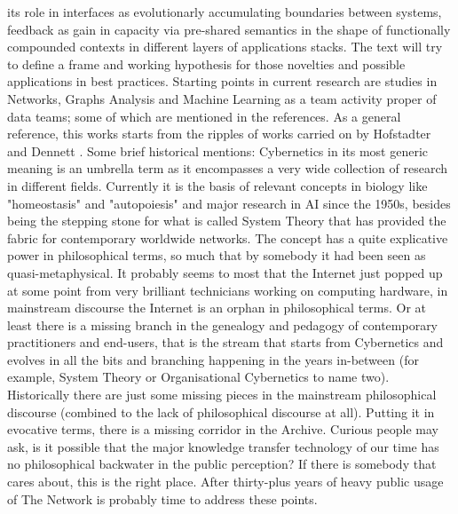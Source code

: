 \documentclass[14pt,a4paper]{extarticle}
\begin{document}
its role in interfaces as evolutionarly accumulating boundaries between systems, feedback as gain in capacity via pre-shared semantics in the shape of functionally compounded contexts in different layers of applications stacks. The text will try to define a frame and working hypothesis for those novelties and possible applications in best practices. Starting points in current research are studies in Networks, Graphs Analysis and Machine Learning as a team activity proper of data teams; some of which are mentioned in the references. As a general reference, this works starts from the ripples of works carried on by Hofstadter and Dennett \cite{hofstadter_gdel_1979} \cite{Hofstadter1981_HOFTMI_2}.
\newline
\hspace*{15mm}Some brief historical mentions: Cybernetics in its most generic meaning is an umbrella term as it encompasses a very wide collection of research in different fields. Currently it is the basis of relevant concepts in biology like "homeostasis" and "autopoiesis" and major research in AI since the 1950s, besides being the stepping stone for what is called System Theory that has provided the fabric for contemporary worldwide networks. The concept has a quite explicative power in philosophical terms, so much that by somebody it had been seen as quasi-metaphysical. It probably seems to most that the Internet just popped up at some point from very brilliant technicians working on computing hardware, in mainstream discourse the Internet is an orphan in philosophical terms. Or at least there is a missing branch in the genealogy and pedagogy of contemporary practitioners and end-users, that is the stream that starts from Cybernetics and evolves in all the bits and branching happening in the years in-between (for example, System Theory or Organisational Cybernetics to name two). Historically there are just some missing pieces in the mainstream philosophical discourse (combined to the lack of philosophical discourse at all). Putting it in evocative terms, there is a missing corridor in the Archive. Curious people may ask, is it possible that the major knowledge transfer technology of our time has no philosophical backwater in the public perception? If there is somebody that cares about, this is the right place. After thirty-plus years of heavy public usage of The Network is probably time to address these points.
\newline
\end{document}

